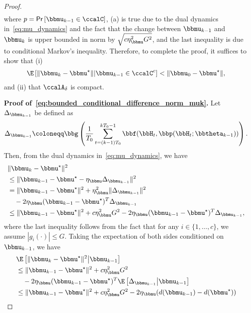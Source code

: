 \begin{proof}
\begin{align}
\end{align}
where $p=\mathsf{Pr}\left[\bbmu_{k-1}\in\ccalC \right]$, (a) is true due to the dual dynamics in~\eqref{eq:mu_dynamics} and the fact that the change between $\bbmu_{k-1}$ and $\bbmu_k$ is upper bounded in norm by $\sqrt{c\eta_{\bbmu}^2 G^2}$, and the last inequality is due to conditional Markov's inequality. Therefore, to complete the proof, it suffices to show that (i)
\begin{align}\label{eq:bounded_conditional_difference_norm_muk}
\E\left[\| \bbmu_k - \bbmu^{\star} \| \middle| \bbmu_{k-1}\in\ccalC^c\right] < \| \bbmu_0 - \bbmu^{\star}\|,
\end{align}
and (ii) that $\ccalA_{\delta}$ is compact.

\noindent\textbf{Proof of~\eqref{eq:bounded_conditional_difference_norm_muk}.}
Let $\Delta_{\bbmu_{k-1}}$ be defined as
\begin{align}
\Delta_{\bbmu_{k-1}} \coloneqq \bbg\left( \frac{1}{T_0} \sum_{t=(k-1)T_0}^{kT_0-1} \bbf(\bbH_{t}, \bbp(\bbH_{t};\bbtheta_{k-1})) \right).
\end{align}
Then, from the dual dynamics in~\eqref{eq:mu_dynamics}, we have
\begin{align*}
&\|\bbmu_{k} - \bbmu^{\star}\|^2 \\
&\leq \|\bbmu_{k-1} - \bbmu^{\star} - \eta_{\bbmu} \Delta_{\bbmu_{k-1}} \|^2 \\
&= \|\bbmu_{k-1} - \bbmu^{\star}  \|^2 + \eta_{\bbmu}^2 \|\Delta_{\bbmu_{k-1}} \|^2 \nonumber \\
&\quad - 2\eta_{\bbmu} (\bbmu_{k-1} - \bbmu^{\star})^T \Delta_{\bbmu_{k-1}} \\
&\leq \|\bbmu_{k-1} - \bbmu^{\star}  \|^2 + c \eta_{\bbmu}^2 G^2 - 2\eta_{\bbmu} (\bbmu_{k-1} - \bbmu^{\star})^T \Delta_{\bbmu_{k-1}},
\end{align*}
where the last inequality follows from the fact that for any $i\in\{1,\dots,c\}$, we assume $|g_i\left(\cdot\right)|\leq G$. Taking the expectation of both sides conditioned on $\bbmu_{k-1}$, we have
\begin{align}
&\E\left[\|\bbmu_{k} - \bbmu^{\star}\|^2 \middle| \bbmu_{k-1}\right] \nonumber\\
&\leq \|\bbmu_{k-1} - \bbmu^{\star}  \|^2 + c \eta_{\bbmu}^2 G^2 \nonumber \\
&\quad - 2\eta_{\bbmu} (\bbmu_{k-1} - \bbmu^{\star})^T \E\left[\Delta_{\bbmu_{k-1}}\middle| \bbmu_{k-1}\right]\\
&\leq \|\bbmu_{k-1} - \bbmu^{\star}  \|^2 + c \eta_{\bbmu}^2 G^2 - 2\eta_{\bbmu} (d(\bbmu_{k-1}) - d(\bbmu^{\star}))\label{eq:subgradient}\\

\end{align}
\end{proof}

